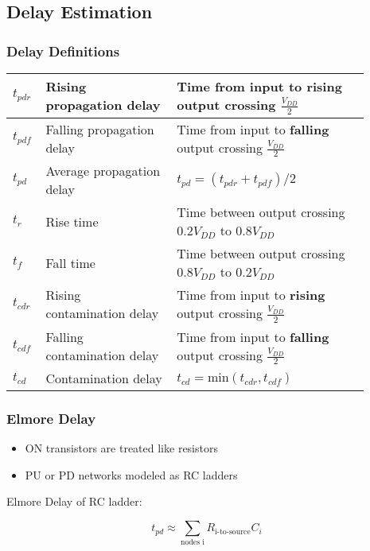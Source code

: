 \subsection{Delay Estimation}
    \subsubsection{Delay Definitions}
    \begin{tabular}{| p{0.05\linewidth} | p{0.34\linewidth} | p{0.5\linewidth} |}
        \hline
        $t_{pdr}$ & Rising propagation delay & Time from input to \textbf{rising} output crossing $\frac{V_{DD}}{2}$\\
        \hline
        $t_{pdf}$ & Falling propagation delay & Time from input to \textbf{falling} output crossing $\frac{V_{DD}}{2}$\\
        \hline
        $t_{pd}$ & Average propagation delay & $t_{pd} = (t_{pdr} + t_{pdf})/2$\\
        \hline
        $t_{r}$ & Rise time & Time between output crossing $0.2V_{DD}$ to $0.8V_{DD}$\\
        \hline
        $t_{f}$ & Fall time & Time between output crossing $0.8V_{DD}$ to $0.2V_{DD}$\\
        \hline
        $t_{cdr}$ & Rising contamination delay & Time from input to \textbf{rising} output crossing $\frac{V_{DD}}{2}$\\
        \hline
        $t_{cdf}$ & Falling contamination delay & Time from input to \textbf{falling} output crossing $\frac{V_{DD}}{2}$\\
        \hline
        $t_{cd}$ & Contamination delay & $t_{cd} = \text{min}(t_{cdr},t_{cdf})$\\
        \hline
    \end{tabular}

    \subsubsection{Elmore Delay}
    \begin{itemize}
        \itemsep0em
        \item ON transistors are treated like resistors
        \item PU or PD networks modeled as RC ladders
    \end{itemize}

    Elmore Delay of RC ladder:

    \begin{equation}
        t_{pd} \approx \sum_{\text{nodes i}} R_{\text{i-to-source}}C_i
    \end{equation}

